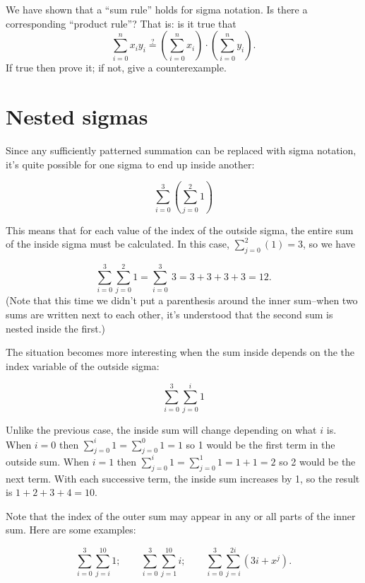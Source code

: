 \begin{exercise}{}
We have shown that a ``sum rule'' holds for sigma notation.  Is there a corresponding ``product rule''? That is: is it true that
\[ \sum_{i=0}^n x_i y_i \stackrel{?}{=} \left(\sum_{i=0}^n x_i \right) \cdot  \left(  \sum_{i=0}^n y_i \right). \]
If true then prove it; if not, give a counterexample.
\end{exercise}


\section{Nested sigmas\quad
{}} \label{sec:sigmaNested}
Since any  sufficiently patterned summation can be replaced with sigma notation, it's quite possible for one sigma to end up inside another:

\[\sum_{i=0}^{3}\left( \sum_{j=0}^{2}1\right)\]

This means that for each value of the index of the outside sigma, the entire sum of the inside sigma must be calculated.  In this case, $\sum_{j=0}^{2}(1)=3$, so we have

\[\sum_{i=0}^{3}\sum_{j=0}^{2}1 =  \sum_{i=0}^{3}\ 3  = 3+3+3+3 = 12. \]
(Note that this time we didn't put a parenthesis around the inner sum--when two sums are written next to each other, it's understood that the second sum is nested inside the first.)

The situation becomes more interesting when the sum inside depends on the the index variable of the outside sigma:

\[\sum_{i=0}^{3}\sum_{j=0}^{i}1\]

Unlike the previous case, the inside sum will change depending on what $i$ is.  When $i=0$ then $\sum_{j=0}^{i}1=\sum_{j=0}^{0}1=1$ so 1 would be the first term in the outside sum.  When $i=1$ then $\sum_{j=0}^{i}1=\sum_{j=0}^{1}1=1+1=2$ so 2 would be the next term.  With each successive term, the inside sum increases by 1, so the result is $1+2+3+4 = 10$.

 Note that the index of the outer sum may appear in any or all parts of the inner sum. Here are some examples:  

\[\sum_{i=0}^{3} \sum_{j=i}^{10}1; \qquad
\sum_{i=0}^{3} \sum_{j=1}^{10}i ; \qquad
\sum_{i=0}^{3}\sum_{j=i}^{2i}(3i+x^j).\]

